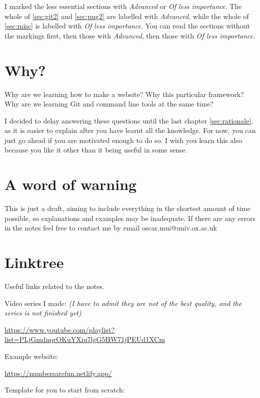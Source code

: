 I marked the less essential sections with \textit{Advanced} or \textit{Of less importance}. The whole of \cref{sec:git2} and \cref{sec:pug2} are labelled with \textit{Advanced}, while the whole of \cref{sec:misc} is labelled with \textit{Of less importance}. You can read the sections without the markings first, then those with \textit{Advanced}, then those with \textit{Of less importance}.

\section{Why?}

Why are we learning how to make a website? Why this particular framework? Why are we learning Git and command line tools at the same time?

I decided to delay answering these questions until the last chapter \cref{sec:rationale}, as it is easier to explain after you have learnt all the knowledge. For now, you can just go ahead if you are motivated enough to do so. I wish you learn this also because you like it other than it being useful in some sense.
 
\section{A word of warning}

This is just a draft, aiming to include everything in the shortest amount of time possible, so explanations and examples may be inadequate. If there are any errors in the notes feel free to contact me by email oscar.mui@univ.ox.ac.uk

\section{Linktree}

Useful links related to the notes.
\vspace{6mm}

Video series I made: \textit{(I have to admit they are not of the best quality, and the series is not finished yet)}

\url{https://www.youtube.com/playlist?list=PLjGmdnqrOKuYXiu7lgG5HW71jPEUd1XCm}
\vspace{6mm}

Example website:

\url{https://numbersarefun.netlify.app/}
\vspace{6mm}

Template for you to start from scratch:

